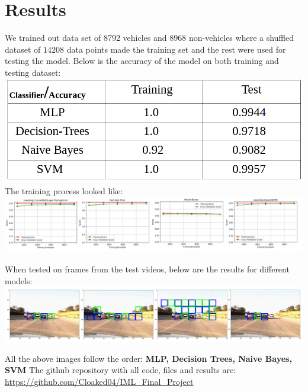 \documentclass{article}
\begin{document}
\section{Results}
We trained out data set of $8792$ vehicles and $8968$ non-vehicles where a shuffled dataset of $14208$ data points made the training set and the rest were used for testing the model. Below is the accuracy of the model on both training and testing dataset:\bigbreak
\includegraphics[width=\textwidth]{result.png}
The training process looked like: \bigbreak \includegraphics[width=\textwidth]{LearningCurve.png}

When tested on frames from the test videos, below are the results for different models: \bigbreak \includegraphics[width=\textwidth]{cars.png}

All the above images follow the order: \textbf{MLP, Decision Trees, Naive Bayes, SVM} The github repository with all code, files and results are: \url{https://github.com/Cloaked04/IML_Final_Project}
\end{document}
